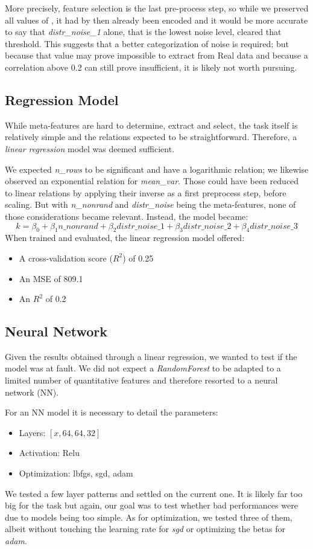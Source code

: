 \documentclass[a4paper,11pt]{article}
\begin{document}
More precisely, feature selection is the last pre-process step, so while we preserved all values of , it had by then already been encoded and it would be more accurate to say that \textit{distr\_noise\_1} alone, that is the lowest noise level, cleared that threshold. This suggests that a better categorization of noise is required; but because that value may prove impossible to extract from Real data and because a correlation above 0.2 can still prove insufficient, it is likely not worth pursuing.

\subsection{Regression Model}
While meta-features are hard to determine, extract and select, the task itself is relatively simple and the relations expected to be straightforward. Therefore, a \textit{linear regression} model was deemed sufficient.

We expected \textit{n\_rows} to be significant and have a logarithmic relation; we likewise observed an exponential relation for \textit{mean\_var}. Those could have been reduced to linear relations by applying their inverse as a first preprocess step, before scaling. But with \textit{n\_nonrand} and \textit{distr\_noise} being the meta-features, none of those considerations became relevant. Instead, the model became:
\[
k = \beta_0 + \beta_1 n\_nonrand + \beta_2 distr\_noise\_1 + \beta_3 distr\_noise\_2 + \beta_4 distr\_noise\_3
\]
When trained and evaluated, the linear regression model offered:
\begin{itemize}
    \item A cross-validation score (\(R^2\)) of 0.25
    \item An MSE of 809.1
    \item An \(R^2\) of 0.2
\end{itemize}

\subsection{Neural Network}
Given the results obtained through a linear regression, we wanted to test if the model was at fault. We did not expect a \textit{RandomForest} to be adapted to a limited number of quantitative features and therefore resorted to a neural network (NN). 

For an NN model it is necessary to detail the parameters:
\begin{itemize}
    \item Layers: \([x, 64, 64, 32]\)
    \item Activation: Relu
    \item Optimization: lbfgs, sgd, adam
\end{itemize}
We tested a few layer patterns and settled on the current one. It is likely far too big for the task but again, our goal was to test whether bad performances were due to models being too simple. As for optimization, we tested three of them, albeit without touching the learning rate for \textit{sgd} or optimizing the betas for \textit{adam}. 
\end{document}
